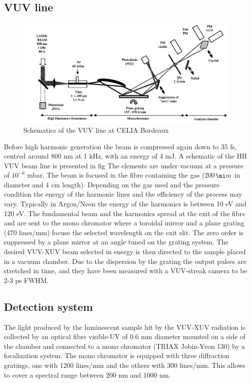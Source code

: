\subsection{VUV line}

\begin{figure}[htbp]
\begin{center}
\includegraphics[width=12cm]{../Pictures/Chapter_7/VUV_line.png}
\end{center}
\caption[VUV line]{Schematics of the VUV line at CELIA Bordeaux}
\label{fig:VUV_line}
\end{figure}
Before high harmonic generation the beam is compressed again down to 35 fs, centred around 800 nm at 1 kHz, with an energy of 4 mJ.
A schematic of the HH VUV beam line is presented in fig
The elements are under vacuum at a pressure of $10^{-6}$ mbar. The beam is focused in the fibre containing the gas (200$\mi m$ in diameter and 4 cm length). Depending on the gas used and the pressure condition the energy of the harmonic lines and the efficiency of the process may vary. Typically in Argon/Neon the energy of the harmonics is between 10 eV and 120 eV.
The fundamental beam and the harmonics spread at the exit of the fibre and are sent to the mono chromator where a toroidal mirror and a plane grating (470 lines/mm) focuse the selected wavelength on the exit slit.
The zero order is suppressed by a plane mirror at an angle tuned on the grating system.
The desired VUV-XUV beam selected in energy is then directed to the sample placed in a vacuum chamber. Due to the dispersion by the grating the output pulses are stretched in time, and they have been measured with a VUV-streak camera to be 2-3 ps FWHM.

\subsection{Detection system}
The light produced by the luminescent sample hit by the VUV-XUV radiation is collected by an optical fibre visible-UV of 0.6 mm diameter mounted on a side of the chamber and connected to a mono chromator (TRIAX Jobin-Yvon 130) by a focalization system.
The mono chromator is equipped with three diffraction gratings, one with 1200 lines/mm and the others with 300 lines/mm. This allows to cover a spectral range between 200 nm and 1000 nm.

